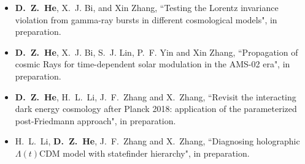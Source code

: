  \begin{itemize}[leftmargin=*]
    \item \textbf{D.~Z.~He}, X.~J. Bi, and Xin Zhang, ``Testing the Lorentz invariance violation from gamma-ray bursts in different cosmological models", in preparation.

    \item \textbf{D.~Z.~He}, X.~J. Bi, S.~J. Lin, P.~F. Yin and Xin Zhang, ``Propagation of cosmic Rays for time-dependent solar modulation in the AMS-02 era", in preparation.
      
    \item \textbf{D.~Z.~He}, H.~L.~Li, J.~F.~Zhang and X.~Zhang, ``Revisit the interacting dark energy cosmology after Planck 2018: application of the parameterized post-Friedmann approach", in preparation.  
    
    \item H.~L.~Li, \textbf{D.~Z.~He}, J.~F.~Zhang and X.~Zhang, ``Diagnosing holographic $\Lambda(t)$CDM model with statefinder hierarchy", in preparation.
    \end{itemize}
